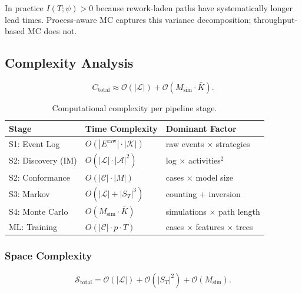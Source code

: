 In practice $I(T; \psi) > 0$ because rework-laden paths have
systematically longer lead times. Process-aware MC captures this variance
decomposition; throughput-based MC does not.


\subsection{Complexity Analysis}
\label{sec:prop-complexity}

\begin{equation}
\label{eq:total-cost}
C_{\text{total}} \approx \mathcal{O}(|\mathcal{L}|)
    + \mathcal{O}(M_{\text{sim}} \cdot \bar{K}).
\end{equation}

\begin{table}[htbp]
\centering
\caption{Computational complexity per pipeline stage.}
\label{tab:complexity}
\begin{tabular}{lll}
\toprule
\textbf{Stage} & \textbf{Time Complexity} & \textbf{Dominant Factor} \\
\midrule
S1: Event Log         & $O(|E^{\text{raw}}| \cdot |\mathcal{K}|)$ & raw events $\times$ strategies \\
S2: Discovery (IM)    & $O(|\mathcal{L}| \cdot |\mathcal{A}|^2)$  & log $\times$ activities$^2$ \\
S2: Conformance       & $O(|\mathcal{C}| \cdot |M|)$              & cases $\times$ model size \\
S3: Markov            & $O(|\mathcal{L}| + |S_T|^3)$              & counting + inversion \\
S4: Monte Carlo       & $O(M_{\text{sim}} \cdot \bar{K})$         & simulations $\times$ path length \\
ML: Training          & $O(|\mathcal{C}| \cdot p \cdot T)$        & cases $\times$ features $\times$ trees \\
\bottomrule
\end{tabular}
\end{table}

\subsubsection{Space Complexity}

\begin{equation}
\label{eq:space-complexity}
\mathcal{S}_{\text{total}} = \mathcal{O}(|\mathcal{L}|)
    + \mathcal{O}(|S_T|^2) + \mathcal{O}(M_{\text{sim}}).
\end{equation}

